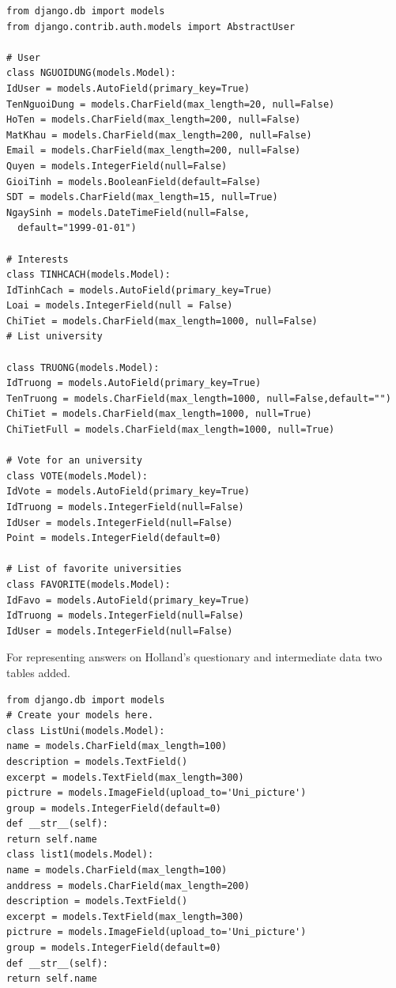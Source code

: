 \documentclass[conference,a4]{IEEEtran}
\begin{document}
\begin{verbatim}
from django.db import models
from django.contrib.auth.models import AbstractUser

# User
class NGUOIDUNG(models.Model):
IdUser = models.AutoField(primary_key=True)
TenNguoiDung = models.CharField(max_length=20, null=False)
HoTen = models.CharField(max_length=200, null=False)
MatKhau = models.CharField(max_length=200, null=False)
Email = models.CharField(max_length=200, null=False)
Quyen = models.IntegerField(null=False)
GioiTinh = models.BooleanField(default=False)
SDT = models.CharField(max_length=15, null=True)
NgaySinh = models.DateTimeField(null=False,
  default="1999-01-01")

# Interests
class TINHCACH(models.Model):
IdTinhCach = models.AutoField(primary_key=True)
Loai = models.IntegerField(null = False)
ChiTiet = models.CharField(max_length=1000, null=False)
# List university

class TRUONG(models.Model):
IdTruong = models.AutoField(primary_key=True)
TenTruong = models.CharField(max_length=1000, null=False,default="")
ChiTiet = models.CharField(max_length=1000, null=True)
ChiTietFull = models.CharField(max_length=1000, null=True)

# Vote for an university
class VOTE(models.Model):
IdVote = models.AutoField(primary_key=True)
IdTruong = models.IntegerField(null=False)
IdUser = models.IntegerField(null=False)
Point = models.IntegerField(default=0)

# List of favorite universities
class FAVORITE(models.Model):
IdFavo = models.AutoField(primary_key=True)
IdTruong = models.IntegerField(null=False)
IdUser = models.IntegerField(null=False)
\end{verbatim}

For representing answers on Holland's questionary and intermediate data two tables added.

\begin{verbatim}
from django.db import models
# Create your models here.
class ListUni(models.Model):
name = models.CharField(max_length=100)
description = models.TextField()
excerpt = models.TextField(max_length=300)
pictrure = models.ImageField(upload_to='Uni_picture')
group = models.IntegerField(default=0)
def __str__(self):
return self.name
class list1(models.Model):
name = models.CharField(max_length=100)
anddress = models.CharField(max_length=200)
description = models.TextField()
excerpt = models.TextField(max_length=300)
pictrure = models.ImageField(upload_to='Uni_picture')
group = models.IntegerField(default=0)
def __str__(self):
return self.name
\end{verbatim}
\end{document}
